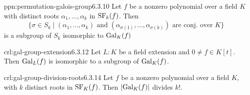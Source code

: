\documentclass[landscape, 8pt]{extarticle}
\begin{document}
\begin{multicols}{3}
\begin{ppn}{ppn:permutation-galois-group}{6.3.10}
    Let $f$ be a nonzero polynomial over a field $K$ with distinct roots $\alpha_{1},\dots,\alpha_{k}$ in $\mathrm{SF}_{k}(f)$. Then
    \[\{\sigma\in S_{k} \mid (\alpha_{1},\dots,\alpha_{k})\text{ and }(\alpha_{\sigma(1)},\dots,\alpha_{\sigma(k)}) \text{ are conj. over $K$}\}\]
    is a subgroup of $S_{k}$ isomorphic to $\operatorname{Gal}_{K}(f)$
\end{ppn}

\begin{crl}{crl:gal-group-extension}{6.3.12}
    Let $L : K$ be a field extension and $0 \ne f \in K[t]$. Then $\operatorname{Gal}_{L}(f)$ is isomorphic to a subgroup of $\operatorname{Gal}_{K}(f)$.
\end{crl}

\begin{crl}{crl:gal-group-division-roots}{6.3.14}
    Let $f$ be a nonzero polynomial over a field $K$, with $k$ distinct roots in $\mathrm{SF}_{K}(f)$. Then $\lvert \operatorname{Gal}_{K}(f) \rvert$ divides $k!$.
\end{crl}




\lipsum[1-6]
\end{multicols}
\end{document}
